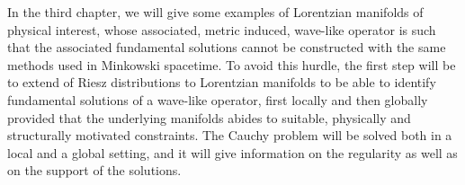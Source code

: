 \noindent In the third chapter, we will give some examples of Lorentzian manifolds of physical interest, whose associated, metric induced, wave-like operator is such that the associated fundamental solutions cannot be constructed with the same methods used in Minkowski spacetime. To avoid this hurdle, the first step will be to extend of Riesz distributions to Lorentzian manifolds to be able to identify fundamental solutions of a wave-like operator, first locally and then globally provided that the underlying manifolds abides to suitable, physically and structurally motivated constraints. The Cauchy problem will be solved both in a local and a global setting, and it will give information on the regularity as well as on the support of the solutions.\\

\thispagestyle{plain}
